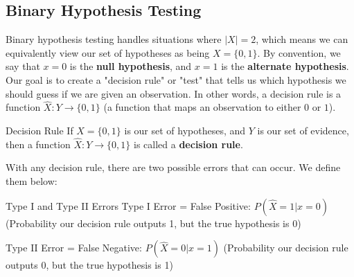 \subsection{Binary Hypothesis Testing}
Binary hypothesis testing handles situations where \(|X| = 2\), which means we can equivalently view our set of hypotheses as being \(X = \{0, 1\}\). By convention, we say that \(x=0\) is the \textbf{null hypothesis}, and \(x=1\) is the \textbf{alternate hypothesis}. Our goal is to create a "decision rule" or "test" that tells us which hypothesis we should guess if we are given an observation. In other words, a decision rule is a function \(\hat{X}:Y \to\{0, 1\}\) (a function that maps an observation to either \(0\) or \(1\)). 
\begin{defn}{Decision Rule}{}
If \(X = \{0, 1\}\) is our set of hypotheses, and \(Y\) is our set of evidence, then a function \(\hat{X}:Y \to\{0, 1\}\) is called a \textbf{decision rule}.
\end{defn}

With any decision rule, there are two possible errors that can occur. We define them below:

\begin{defn}{Type I and Type II Errors}{}
Type I Error = False Positive: \(P(\hat{X} = 1 |x=0)\) (Probability our decision rule outputs 1, but the true hypothesis is 0) \newline 

Type II Error = False Negative: \(P(\hat{X} = 0 |x=1)\) (Probability our decision rule outputs 0, but the true hypothesis is 1) \newline 
\end{defn}

